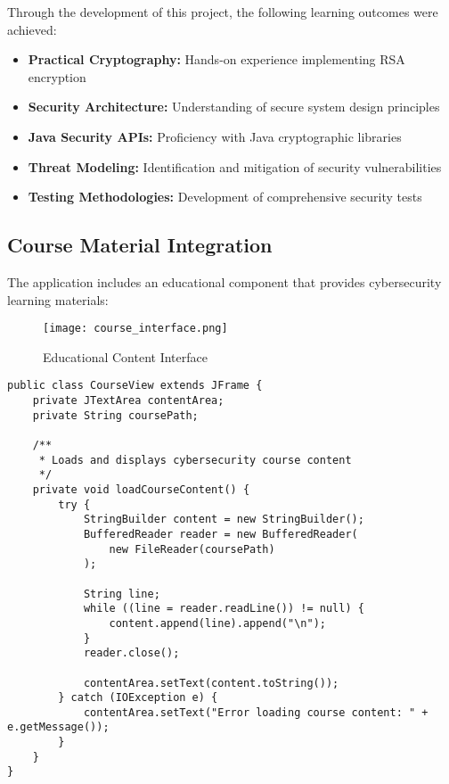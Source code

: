 \documentclass[12pt,a4paper]{article}
\begin{document}
Through the development of this project, the following learning outcomes were achieved:

\begin{itemize}
    \item \textbf{Practical Cryptography:} Hands-on experience implementing RSA encryption
    \item \textbf{Security Architecture:} Understanding of secure system design principles
    \item \textbf{Java Security APIs:} Proficiency with Java cryptographic libraries
    \item \textbf{Threat Modeling:} Identification and mitigation of security vulnerabilities
    \item \textbf{Testing Methodologies:} Development of comprehensive security tests
\end{itemize}

\subsection{Course Material Integration}

The application includes an educational component that provides cybersecurity learning materials:

\begin{figure}[H]
    \centering
    \texttt{[image: course\_interface.png]}
    \caption{Educational Content Interface}
    \label{fig:course}
\end{figure}

\begin{lstlisting}[caption=Course Content Integration]
public class CourseView extends JFrame {
    private JTextArea contentArea;
    private String coursePath;

    /**
     * Loads and displays cybersecurity course content
     */
    private void loadCourseContent() {
        try {
            StringBuilder content = new StringBuilder();
            BufferedReader reader = new BufferedReader(
                new FileReader(coursePath)
            );

            String line;
            while ((line = reader.readLine()) != null) {
                content.append(line).append("\n");
            }
            reader.close();

            contentArea.setText(content.toString());
        } catch (IOException e) {
            contentArea.setText("Error loading course content: " + e.getMessage());
        }
    }
}
\end{lstlisting}
\end{document}
